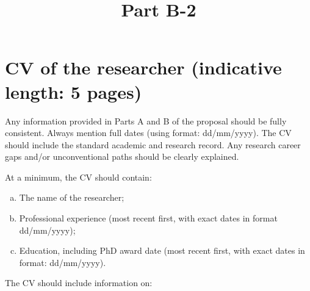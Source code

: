 \documentclass[11pt,draftproposal]{msca-pf}
\title{Part B-2}
\author{}
\date{}
\begin{document}
\maketitle

\section{CV of the researcher (indicative length: 5 pages)}

Any information provided in Parts A and B of the proposal should be fully consistent.
Always mention full dates (using format: dd/mm/yyyy). The CV should include the
standard academic and research record. Any research career gaps and/or unconventional
paths should be clearly explained.

At a minimum, the CV should contain:

\begin{enumerate}[a)]
    \item The name of the researcher;
    \item Professional experience (most recent first, with exact dates in format
    dd/mm/yyyy);
    \item Education, including PhD award date (most recent first, with exact
    dates in format: dd/mm/yyyy).
\end{enumerate}

The CV should include information on:
\end{document}
